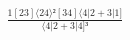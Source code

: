 \documentclass[varwidth, border=5pt]{standalone}
\begin{document}
\begin{my}
$\begin{gathered}
\scriptscriptstyle\frac{1[23]⟨24⟩²[34]⟨4|2+3|1]}{⟨4|2+3|4]³}
\end{gathered}$
\end{my}
\end{document}
